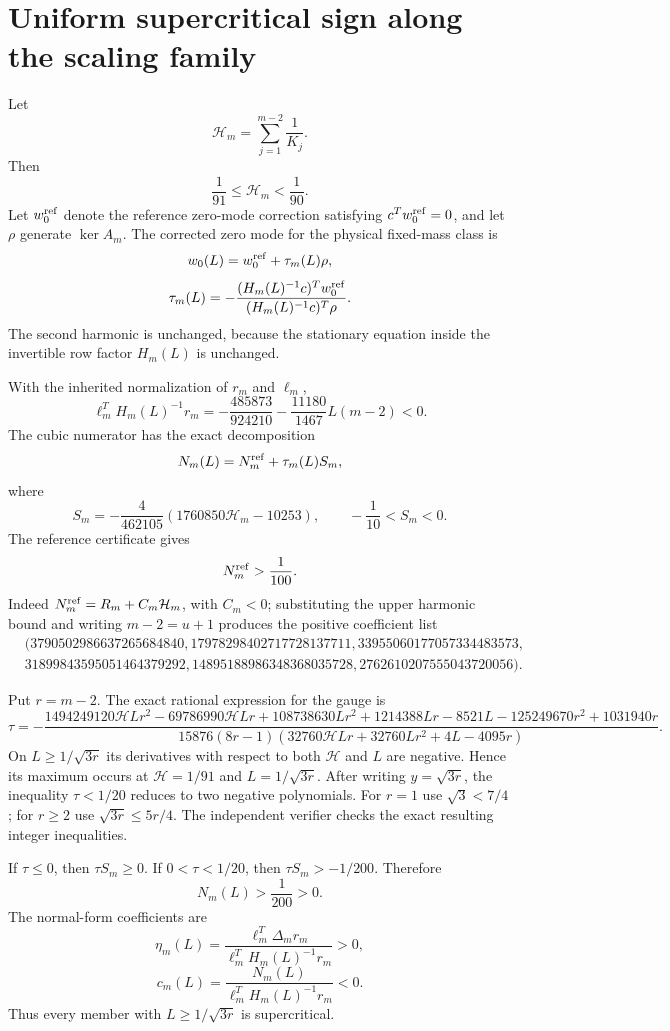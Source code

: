 \section*{Uniform supercritical sign along the scaling family}
Let
\[
 \mathcal H_m=\sum_{j=1}^{m-2}\frac1{K_j}.
\]
Then
\[
 \frac1{91}\le\mathcal H_m<\frac1{90}.
\]
Let $w_0^{\rm ref}$ denote the reference zero-mode correction satisfying
$c^Tw_0^{\rm ref}=0$, and let $\rho$ generate $\ker A_m$.  The corrected
zero mode for the physical fixed-mass class is
\[
 w_0(L)=w_0^{\rm ref}+\tau_m(L)\rho,
\]
\[
 \tau_m(L)=-\frac{(H_m(L)^{-1}c)^Tw_0^{\rm ref}}
 {(H_m(L)^{-1}c)^T\rho}.
\]
The second harmonic is unchanged, because the stationary equation inside the
invertible row factor $H_m(L)$ is unchanged.

With the inherited normalization of $r_m$ and $\ell_m$,
\[
 \ell_m^TH_m(L)^{-1}r_m
 =-\frac{485873}{924210}-\frac{11180}{1467}L(m-2)<0.
\]
The cubic numerator has the exact decomposition
\[
 N_m(L)=N_m^{\rm ref}+\tau_m(L)S_m,
\]
where
\[
 S_m=-\frac4{462105}(1760850\mathcal H_m-10253),
 \qquad -\frac1{10}<S_m<0.
\]
The reference certificate gives
\[
 N_m^{\rm ref}>\frac1{100}.
\]
Indeed $N_m^{\rm ref}=R_m+C_m\mathcal H_m$, with $C_m<0$; substituting the
upper harmonic bound and writing $m-2=u+1$ produces the positive coefficient
list
\[
\begin{split}
&(3790502986637265684840,
17978298402717728137711,
33955060177057334483573,\\
&31899843595051464379292,
14895188986348368035728,
2762610207555043720056).
\end{split}
\]

Put $r=m-2$.  The exact rational expression for the gauge is
\[
 \tau=-\frac{
1494249120\mathcal H Lr^2-69786990\mathcal H Lr
+108738630Lr^2+1214388Lr-8521L-125249670r^2+1031940r}
{15876(8r-1)(32760\mathcal H Lr+32760Lr^2+4L-4095r)}.
\]
On $L\ge1/\sqrt{3r}$ its derivatives with respect to both $\mathcal H$ and
$L$ are negative.  Hence its maximum occurs at
$\mathcal H=1/91$ and $L=1/\sqrt{3r}$.  After writing
$y=\sqrt{3r}$, the inequality $\tau<1/20$ reduces to two negative
polynomials.  For $r=1$ use $\sqrt3<7/4$; for $r\ge2$ use
$\sqrt{3r}\le5r/4$.  The independent verifier checks the exact resulting
integer inequalities.

If $\tau\le0$, then $\tau S_m\ge0$.  If $0<\tau<1/20$, then
$\tau S_m>-1/200$.  Therefore
\[
 N_m(L)>\frac1{200}>0.
\]
The normal-form coefficients are
\[
 \eta_m(L)=\frac{\ell_m^T\Delta_m r_m}
 {\ell_m^TH_m(L)^{-1}r_m}>0,
\]
\[
 c_m(L)=\frac{N_m(L)}{\ell_m^TH_m(L)^{-1}r_m}<0.
\]
Thus every member with $L\ge1/\sqrt{3r}$ is supercritical.
